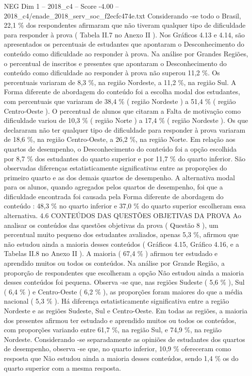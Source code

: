 \begin{textsample}{NEG Dim 1 – 2018\_c4 – Score -4.00 – 2018\_c4/enade\_2018\_serv\_soc\_f2ecfc474e.txt}
Considerando -se todo o Brasil, 22,1 \% dos respondentes afirmaram que não tiveram qualquer tipo de dificuldade para responder à prova ( Tabela II.7 no Anexo II ).
Nos Gráficos 4.13 e 4.14, são apresentados os percentuais de estudantes que apontaram o Desconhecimento do conteúdo como dificuldade ao responder à prova.
Na análise por Grandes Regiões, o percentual de inscritos e presentes que apontaram o Desconhecimento do conteúdo como dificuldade ao responder à prova não superou 11,2 \%.
Os percentuais variaram de 8,3 \%, na região Nordeste, a 11,2 \%, na região Sul.
A Forma diferente de abordagem do conteúdo foi a escolha modal dos estudantes, com percentuais que variaram de 38,4 \% ( região Nordeste ) a 51,4 \% ( região Centro-Oeste ).
O percentual de alunos que citaram a Falta de motivação como dificuldade variou de 10,3 \% ( região Norte ) a 17,4 \% ( região Nordeste ).
Os que declararam não ter qualquer tipo de dificuldade para responder à prova variaram de 18,6 \%, na região Centro-Oeste, a 26,2 \%, na região Norte.
Em relação aos quartos de desempenho, o Desconhecimento do conteúdo foi a opção escolhida por 8,7 \% dos estudantes do quarto superior e por 11,7 \% do quarto inferior.
São observadas diferenças estatisticamente significativas entre as proporções do primeiro quarto e as dos demais quartos de desempenho.
A alternativa modal para os alunos, quando agregados pelos quartos de desempenho, foi que a dificuldade encontrada foi causada pela Forma diferente de abordagem do conteúdo : 48,3 \% no quarto inferior e 37,0 \% do quarto superior escolheram essa alternativa. 4.6 CONTEÚDOS DAS QUESTÕES OBJETIVAS DA PROVA Ao analisar os conteúdos das questões objetivas da prova ( Questão 8 ), um percentual muito pequeno dos estudantes avaliados, apenas 5,3 \%, afirmou que não estudou ainda a maioria desses conteúdos ( Gráficos 4.15, Gráfico 4.16, e a Tabelas II.8 no Anexo II ).
A maioria ( 67,4 \% ) afirmou ter estudado e aprendido muitos ou todos os conteúdos.
Na análise por Grande Região, a proporção de respondentes que escolheram a opção Não estudou ainda a maioria desses conteúdos foi pequena.
Observa -se que, nas regiões Sudeste ( 5,6 \% ), Sul ( 6,4 \% ) e Centro-Oeste ( 6,2 \% ), as proporções foram maiores do que a média nacional ( 5,3 \% ).
Há diferença estatisticamente significativa entre a região Nordeste e as regiões Sudeste, Sul e Centro-Oeste.
Em todas as regiões, a maioria dos presentes afirmou ter estudado e aprendido muitos ou todos os conteúdos, com proporções variando entre 61,7 \%, na região Sul, e 74,9 \%, na região Nordeste.
Considerando -se separadamente as opiniões de estudantes dos quartos de desempenho, observa -se que, no quarto inferior, 10,9 \% ofereceram como resposta que Não estudou ainda a maioria desses conteúdos, sendo 1,4 \% os do quarto superior com a mesma resposta.

\end{textsample}
